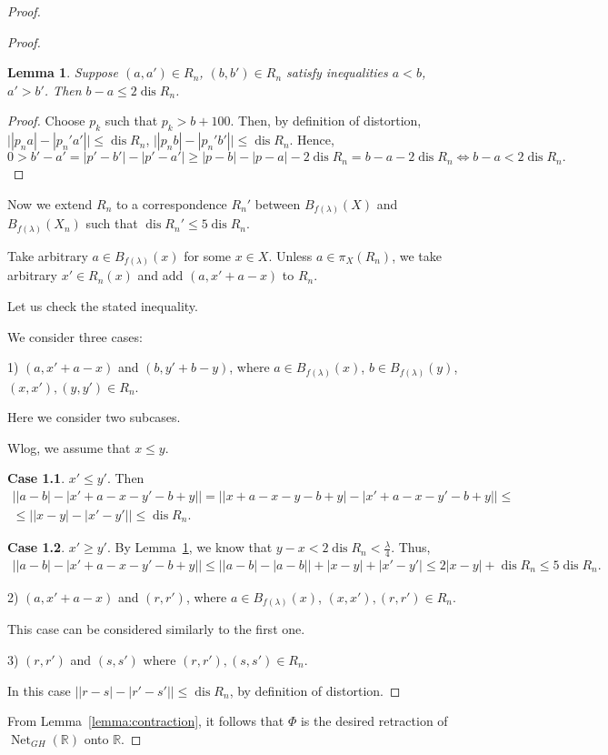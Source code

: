 \documentclass{article}
\newtheorem{lemma}{Lemma}[]
\theoremstyle{definition}
\theoremstyle{plain}
\newcommand{\dis}{\operatorname{dis}}
\renewcommand{\:}{\colon}
\newcommand{\0}{\emptyset}
\renewcommand{\(}{\rom(}
\renewcommand{\)}{\rom)}
\newcommand{\R}{\mathbb{R}}
\newcommand{\nets}{\operatorname{Net}}
\begin{document}
\begin{proof}
\begin{proof}
\begin{lemma}\label{lemma: order_change} Suppose $(a, a')\in R_n$, $(b, b')\in R_n$ satisfy inequalities $a < b$, $a' > b'$. Then $b-a \le 2\dis R_n$. 
\end{lemma}

\begin{proof}
Choose $p_k$ such that $p_k > b+100$. Then, by definition of distortion, $\big||p_na|-|p_n'a'|\big|\le \dis R_n$, $\big||p_nb|-|p_n'b'|\big|\le \dis R_n$. Hence, $$0 > b' - a' = |p'-b'| - |p'-a'|\ge |p - b| - |p-a| - 2\dis R_n = b-a - 2\dis R_n \Longleftrightarrow b-a < 2\dis R_n.$$
\end{proof}

Now we extend $R_n$ to a correspondence $R_n'$ between $B_{f(\lambda)}(X)$ and $B_{f(\lambda)}(X_n)$ such that $\dis R_n'\le 5\dis R_n$. 

Take arbitrary $a\in B_{f(\lambda)}(x)$ for some $x\in X$. Unless $a\in\pi_X(R_n)$, we take arbitrary $x'\in R_n(x)$ and add $(a, x' + a - x)$ to $R_n$. 

Let us check the stated inequality. 

We consider three cases:

1) $(a, x' + a-x)$ and $(b, y'+b -y)$, where $a\in B_{f(\lambda)}(x)$, $b\in B_{f(\lambda)}(y)$, $(x, x'), (y, y')\in R_n$.

Here we consider two subcases. 

Wlog, we assume that $x \le y$. 

\textbf{Case 1.1}. $x' \le y'$. Then 
\begin{multline*}
\big||a-b| - |x'+a-x - y'-b + y|\big| = \big||x + a-x - y - b + y| - |x'+a-x - y'-b + y|\big| \le\\\le \big||x-y| - |x'-y'|\big|\le \dis R_n.
\end{multline*}

\textbf{Case 1.2}. $x' \ge y'$. By Lemma~\ref{lemma: order_change}, we know that $y-x<2\dis R_n < \frac{\lambda}{4}$. Thus,
\begin{align*}
\big||a-b| - |x'+a-x - y'-b + y|\big| \le \big||a-b| - |a-b|\big| + |x-y|+|x'-y'|\le 2|x-y| + \dis R_n\le  5\dis R_n.
\end{align*}


2) $(a, x' + a-x)$ and $(r, r')$, where $a\in B_{f(\lambda)}(x)$, $(x, x'), (r, r')\in R_n$.

This case can be considered similarly to the first one.

3) $(r, r')$ and $(s, s')$ where $(r, r'), (s, s')\in R_n$. 

In this case $\big||r-s|-|r'-s'|\bigr|\le \dis R_n$, by definition of distortion.
\end{proof}


From Lemma~\ref{lemma:contraction}, it follows that $\Phi$ is the desired retraction of $\nets_{GH}(\R)$ onto $\R$.
\end{proof}
\end{document}
